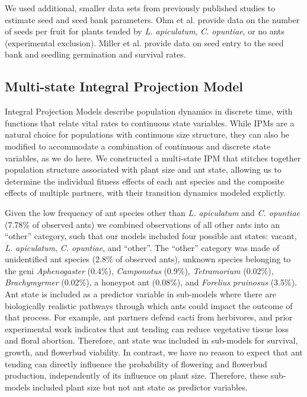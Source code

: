 \documentclass[11pt]{article}
\begin{document}
	We used additional, smaller data sets from previously published studies to estimate seed and seed bank parameters. 
	Ohm et al. \citep{Ohm2014} provide data on the number of seeds per fruit for plants tended by \textit{L. apiculatum}, \textit{C. opuntiae}, or no ants (experimental exclusion). 
	Miller et al. \citep{Miller2009} provide data on seed entry to the seed bank and seedling germination and survival rates. 
	
	
	\subsection*{Multi-state Integral Projection Model}
	Integral Projection Models describe population dynamics in discrete time, with functions that relate vital rates to continuous state variables. 
	While IPMs are a natural choice for populations with continuous size structure, they can also be modified to accommodate a combination of continuous and discrete state variables, as we do here. 
	We constructed a multi-state IPM that stitches together population structure associated with plant size and ant state, allowing us to determine the individual fitness effects of each ant species and the composite effects of multiple partners, with their transition dynamics modeled explictly. 
	
	Given the low frequency of ant species other than \textit{L. apiculatum} and \textit{C. opuntiae} (7.78\% of observed ants) we combined observations of all other ants into an ``other'' category, such that our models included four possible ant states: vacant, \textit{L. apiculatum}, \textit{C. opuntiae}, and ``other''. 
	The ``other'' category was made of unidentified ant species (2.8\% of observed ants), unknown species belonging to the geni \textit{Aphenogaster} (0.4\%),  \textit{Camponotus} (0.9\%),  \textit{Tetramorium} (0.02\%), \textit{Brachymyrmer} (0.02\%), a honeypot ant (0.08\%), and \textit{Forelius pruinosus} (3.5\%).
	Ant state is included as a predictor variable in sub-models where there are biologically realistic pathways through which ants could impact the outcome of that process. 
	For example, ant partners defend cacti from herbivores, and prior experimental work indicates that ant tending can reduce vegetative tissue loss and floral abortion.
	Therefore, ant state was included in sub-models for survival, growth, and flowerbud viability. 
	In contrast, we have no reason to expect that ant tending can directly influence the probability of flowering and flowerbud production, independently of its influence on plant size. 
	Therefore, these sub-models included plant size but not ant state as predictor variables. 
	
\end{document}
